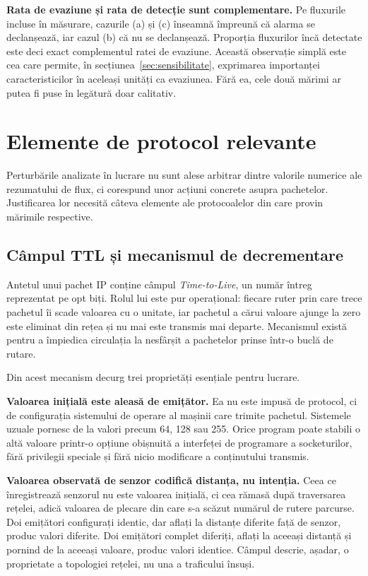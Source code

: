 \textbf{Rata de evaziune și rata de detecție sunt complementare.} Pe fluxurile incluse în măsurare, cazurile (a) și (c) înseamnă împreună că alarma se declanșează, iar cazul (b) că nu se declanșează. Proporția fluxurilor încă detectate este deci exact complementul ratei de evaziune. Această observație simplă este cea care permite, în secțiunea~\ref{sec:sensibilitate}, exprimarea importanței caracteristicilor în aceleași unități ca evaziunea. Fără ea, cele două mărimi ar putea fi puse în legătură doar calitativ.

\section{Elemente de protocol relevante}\label{sec:protocoale}

Perturbările analizate în lucrare nu sunt alese arbitrar dintre valorile numerice ale rezumatului de flux, ci corespund unor acțiuni concrete asupra pachetelor. Justificarea lor necesită câteva elemente ale protocoalelor din care provin mărimile respective.

\subsection{Câmpul TTL și mecanismul de decrementare}\label{subsec:ttl}

Antetul unui pachet IP conține câmpul \textit{Time-to-Live}, un număr întreg reprezentat pe opt biți. Rolul lui este pur operațional: fiecare ruter prin care trece pachetul îi scade valoarea cu o unitate, iar pachetul a cărui valoare ajunge la zero este eliminat din rețea și nu mai este transmis mai departe. Mecanismul există pentru a împiedica circulația la nesfârșit a pachetelor prinse într-o buclă de rutare.

Din acest mecanism decurg trei proprietăți esențiale pentru lucrare.

\textbf{Valoarea inițială este aleasă de emițător.} Ea nu este impusă de protocol, ci de configurația sistemului de operare al mașinii care trimite pachetul. Sistemele uzuale pornesc de la valori precum 64, 128 sau 255. Orice program poate stabili o altă valoare printr-o opțiune obișnuită a interfeței de programare a socketurilor, fără privilegii speciale și fără nicio modificare a conținutului transmis.

\textbf{Valoarea observată de senzor codifică distanța, nu intenția.} Ceea ce înregistrează senzorul nu este valoarea inițială, ci cea rămasă după traversarea rețelei, adică valoarea de plecare din care s-a scăzut numărul de rutere parcurse. Doi emițători configurați identic, dar aflați la distanțe diferite față de senzor, produc valori diferite. Doi emițători complet diferiți, aflați la aceeași distanță și pornind de la aceeași valoare, produc valori identice. Câmpul descrie, așadar, o proprietate a topologiei rețelei, nu una a traficului însuși.

